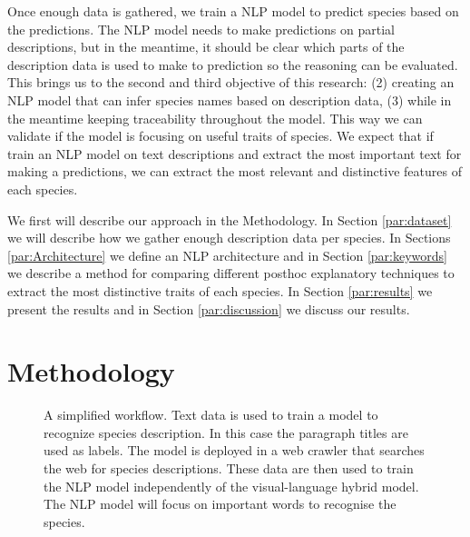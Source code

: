 \documentclass[a4paper, 12pt, oneside]{book} %
\begin{document}
Once enough data is gathered, we train a NLP model to predict species based on the predictions.
The NLP model needs to make predictions on partial descriptions, but in the meantime, it should be clear which parts of the description data is used to make to prediction so the reasoning can be evaluated. 
This brings us to the second and third objective of this research: (2) creating an NLP model that can infer species names based on description data, (3) while in the meantime keeping traceability throughout the model.
This way we can validate if the model is focusing on useful traits of species.
We expect that if train an NLP model on text descriptions and extract the most important text for making a predictions, we can extract the most relevant and distinctive features of each species.

We first will describe our approach in the Methodology.
In Section \ref{par:dataset} we will describe how we gather enough description data per species.
In Sections \ref{par:Architecture} we define an NLP architecture and in Section \ref{par:keywords} we describe a method for comparing different posthoc explanatory techniques to extract the most distinctive traits of each species.
In Section \ref{par:results} we present the results and in Section \ref{par:discussion} we discuss our results.

\newpage
\section{Methodology} \label{par:methodoly}


\begin{figure} [t]
    \centering
    \caption[Workflow]{A simplified workflow. Text data is used to train a model to recognize species description. In this case the paragraph titles are used as labels. The model is deployed in a web crawler that searches the web for species descriptions. These data are then used to train the NLP model independently of the visual-language hybrid model. The NLP model will focus on important words to recognise the species.}
    \label{fig:workflow}
\end{figure}
\end{document}
